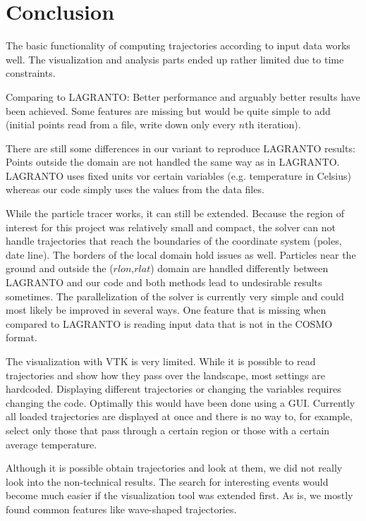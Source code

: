 \chapter{Conclusion}

The basic functionality of computing trajectories according to input data works well. The visualization and analysis parts ended up rather limited due to time constraints.

Comparing to LAGRANTO: Better performance and arguably better results have been achieved. Some features are missing but would be quite simple to add (initial points read from a file, write down only every $n$th iteration).

There are still some differences in our variant to reproduce LAGRANTO results: Points outside the domain are not handled the same way as in LAGRANTO. LAGRANTO uses fixed units vor certain variables (e.g. temperature in Celsius) whereas our code simply uses the values from the data files.

While the particle tracer works, it can still be extended. Because the region of interest for this project was relatively small and compact, the solver can not handle trajectories that reach the boundaries of the coordinate system (poles, date line). The borders of the local domain hold issues as well. Particles near the ground and outside the ($rlon$,$rlat$) domain are handled differently between LAGRANTO and our code and both methods lead to undesirable results sometimes. The parallelization of the solver is currently very simple and could most likely be improved in several ways. One feature that is missing when compared to LAGRANTO is reading input data that is not in the COSMO format.

The visualization with VTK is very limited. While it is possible to read trajectories and show how they pass over the landscape, most settings are hardcoded. Displaying different trajectories or changing the variables requires changing the code. Optimally this would have been done using a GUI. Currently all loaded trajectories are displayed at once and there is no way to, for example, select only those that pass through a certain region or those with a certain average temperature.

Although it is possible obtain trajectories and look at them, we did not really look into the non-technical results. The search for interesting events would become much easier if the visualization tool was extended first. As is, we mostly found common features like wave-shaped trajectories.

